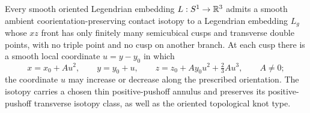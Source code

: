 \begin{theorem}
\label{fd:generic-front}
Every smooth oriented Legendrian embedding $L:S^1\to\mathbb R^3$ admits
a smooth ambient coorientation-preserving contact isotopy to a
Legendrian embedding $L_g$ whose $xz$ front has only finitely many
semicubical cusps and transverse double points, with no triple point
and no cusp on another branch. At each cusp there is a smooth local
coordinate $u=y-y_0$ in which
\begin{equation}\label{fd:generic-exact-germ}
 x=x_0+Au^2,\qquad y=y_0+u,\qquad
 z=z_0+Ay_0u^2+\tfrac23 Au^3,\qquad A\ne0;
\end{equation}
the coordinate $u$ may increase or decrease along the prescribed
orientation. The isotopy carries a chosen thin
positive-pushoff annulus and preserves its positive-pushoff transverse
isotopy class, as well as the oriented topological knot type.
\end{theorem}
